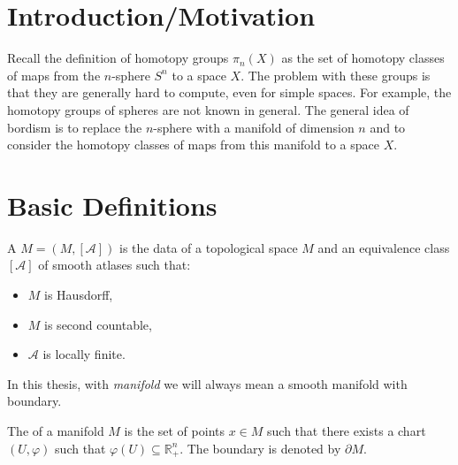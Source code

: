\documentclass[a4paper,11pt]{article}
\begin{document}
\maketitle
{}
\tableofcontents
{}

\setcounter{section}{-1}

\section{Introduction/Motivation}

Recall the definition of homotopy groups \(\pi_n(X)\) as the set of homotopy classes of maps from the \(n\)-sphere \(S^n\) to a space \(X\). 
The problem with these groups is that they are generally hard to compute, even for simple spaces. 
For example, the homotopy groups of spheres are not known in general.
The general idea of bordism is to replace the \(n\)-sphere with a manifold of dimension \(n\) and to consider the homotopy classes of maps from this manifold to a space \(X\).

\section{Basic Definitions}

\begin{definition}[Manifold]
    A  \(M=(M,[\mathcal{A}])\) is the data of a topological space \(M\) and an equivalence class \([\mathcal{A}]\) of smooth atlases such that:
    \begin{itemize}
        \item \(M\) is Hausdorff,
        \item \(M\) is second countable,
        \item \(\mathcal{A}\) is locally finite.
    \end{itemize}
\end{definition}

\begin{remark}
    In this thesis, with \emph{manifold} we will always mean a smooth manifold with boundary.
\end{remark}

\begin{definition}[Boundary]
    The  of a manifold \(M\) is the set of points \(x\in M\) such that there exists a chart \((U,\varphi)\) such that \(\varphi(U)\subseteq\mathbb{R}^n_+\). 
    The boundary is denoted by \(\partial M\).
\end{definition}
\end{document}
